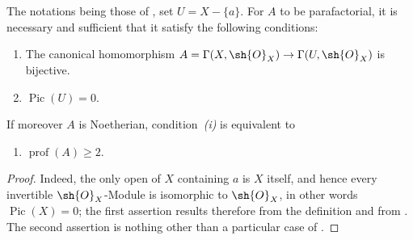 \begin{proposition}[21.13.8]
\label{IV.21.13.8}
The notations being those of , set $U=X-\{a\}$.
For $A$ to be parafactorial, it is necessary and sufficient that it satisfy the following conditions:
\begin{enumerate}
  \item[(i)] The canonical homomorphism $A=\Gamma(X,\sh{O}_X)\to\Gamma(U,\sh{O}_X)$ is bijective.
  \item[(ii)] $\operatorname{Pic}(U)=0$.
\end{enumerate}

If moreover $A$ is Noetherian, condition~\emph{(i)} is equivalent to
\begin{enumerate}
  \item[(i bis)] $\operatorname{prof}(A)\geq 2$.
\end{enumerate}
\end{proposition}

\begin{proof}
Indeed, the only open of $X$ containing $a$ is $X$ itself, and hence every invertible $\sh{O}_X$-Module is isomorphic to $\sh{O}_X$, in other words $\operatorname{Pic}(X)=0$; the first assertion results therefore from the definition  and from .
The second assertion is nothing other than a particular case of .
\end{proof}


